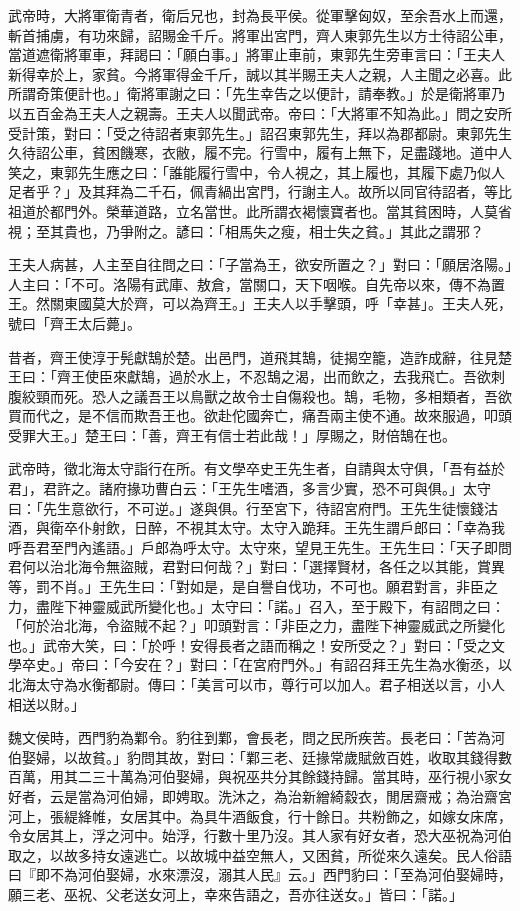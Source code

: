 \begin{pinyinscope}
武帝時，大將軍衛青者，衛后兄也，封為長平侯。從軍擊匈奴，至余吾水上而還，斬首捕虜，有功來歸，詔賜金千斤。將軍出宮門，齊人東郭先生以方士待詔公車，當道遮衛將軍車，拜謁曰：「願白事。」將軍止車前，東郭先生旁車言曰：「王夫人新得幸於上，家貧。今將軍得金千斤，誠以其半賜王夫人之親，人主聞之必喜。此所謂奇策便計也。」衛將軍謝之曰：「先生幸告之以便計，請奉教。」於是衛將軍乃以五百金為王夫人之親壽。王夫人以聞武帝。帝曰：「大將軍不知為此。」問之安所受計策，對曰：「受之待詔者東郭先生。」詔召東郭先生，拜以為郡都尉。東郭先生久待詔公車，貧困饑寒，衣敝，履不完。行雪中，履有上無下，足盡踐地。道中人笑之，東郭先生應之曰：「誰能履行雪中，令人視之，其上履也，其履下處乃似人足者乎？」及其拜為二千石，佩青緺出宮門，行謝主人。故所以同官待詔者，等比祖道於都門外。榮華道路，立名當世。此所謂衣褐懷寶者也。當其貧困時，人莫省視；至其貴也，乃爭附之。諺曰：「相馬失之瘦，相士失之貧。」其此之謂邪？

王夫人病甚，人主至自往問之曰：「子當為王，欲安所置之？」對曰：「願居洛陽。」人主曰：「不可。洛陽有武庫、敖倉，當關口，天下咽喉。自先帝以來，傳不為置王。然關東國莫大於齊，可以為齊王。」王夫人以手擊頭，呼「幸甚」。王夫人死，號曰「齊王太后薨」。

昔者，齊王使淳于髡獻鵠於楚。出邑門，道飛其鵠，徒揭空籠，造詐成辭，往見楚王曰：「齊王使臣來獻鵠，過於水上，不忍鵠之渴，出而飲之，去我飛亡。吾欲刺腹絞頸而死。恐人之議吾王以鳥獸之故令士自傷殺也。鵠，毛物，多相類者，吾欲買而代之，是不信而欺吾王也。欲赴佗國奔亡，痛吾兩主使不通。故來服過，叩頭受罪大王。」楚王曰：「善，齊王有信士若此哉！」厚賜之，財倍鵠在也。

武帝時，徵北海太守詣行在所。有文學卒史王先生者，自請與太守俱，「吾有益於君」，君許之。諸府掾功曹白云：「王先生嗜酒，多言少實，恐不可與俱。」太守曰：「先生意欲行，不可逆。」遂與俱。行至宮下，待詔宮府門。王先生徒懷錢沽酒，與衛卒仆射飲，日醉，不視其太守。太守入跪拜。王先生謂戶郎曰：「幸為我呼吾君至門內遙語。」戶郎為呼太守。太守來，望見王先生。王先生曰：「天子即問君何以治北海令無盜賊，君對曰何哉？」對曰：「選擇賢材，各任之以其能，賞異等，罰不肖。」王先生曰：「對如是，是自譽自伐功，不可也。願君對言，非臣之力，盡陛下神靈威武所變化也。」太守曰：「諾。」召入，至于殿下，有詔問之曰：「何於治北海，令盜賊不起？」叩頭對言：「非臣之力，盡陛下神靈威武之所變化也。」武帝大笑，曰：「於呼！安得長者之語而稱之！安所受之？」對曰：「受之文學卒史。」帝曰：「今安在？」對曰：「在宮府門外。」有詔召拜王先生為水衡丞，以北海太守為水衡都尉。傳曰：「美言可以市，尊行可以加人。君子相送以言，小人相送以財。」

魏文侯時，西門豹為鄴令。豹往到鄴，會長老，問之民所疾苦。長老曰：「苦為河伯娶婦，以故貧。」豹問其故，對曰：「鄴三老、廷掾常歲賦斂百姓，收取其錢得數百萬，用其二三十萬為河伯娶婦，與祝巫共分其餘錢持歸。當其時，巫行視小家女好者，云是當為河伯婦，即娉取。洗沐之，為治新繒綺縠衣，閒居齋戒；為治齋宮河上，張緹絳帷，女居其中。為具牛酒飯食，行十餘日。共粉飾之，如嫁女床席，令女居其上，浮之河中。始浮，行數十里乃沒。其人家有好女者，恐大巫祝為河伯取之，以故多持女遠逃亡。以故城中益空無人，又困貧，所從來久遠矣。民人俗語曰『即不為河伯娶婦，水來漂沒，溺其人民』云。」西門豹曰：「至為河伯娶婦時，願三老、巫祝、父老送女河上，幸來告語之，吾亦往送女。」皆曰：「諾。」


\end{pinyinscope}
